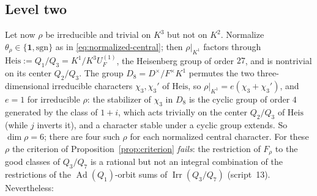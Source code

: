 \documentclass[11pt]{article}
\newcommand{\Irr}{\operatorname{Irr}}
\newcommand{\Ad}{\operatorname{Ad}}
\theoremstyle{plain}
\theoremstyle{definition}
\begin{document}
\subsection{Level two}\label{subsec:targetB}
Let now $\rho$ be irreducible and trivial on $K^3$ but not on $K^2$.
Normalize $\theta_\rho\in\{\mathbf1,\mathrm{sgn}\}$ as in
\eqref{eq:normalized-central}; then $\rho|_{K^1}$ factors through
$\mathrm{Heis}:=Q_1/Q_3=K^1/K^3U_F^{(1)}$, the Heisenberg group of order
$27$, and is nontrivial on its center $Q_2/Q_3$.  The group
$D_8=D^\times/F^\times K^1$ permutes the two three-dimensional
irreducible characters $\chi_3,\chi_3'$ of $\mathrm{Heis}$, so
$\rho|_{K^1}=e(\chi_3+\chi_3')$, and $e=1$ for irreducible $\rho$: the
stabilizer of $\chi_3$ in $D_8$ is the cyclic group of order $4$
generated by the class of $1+i$, which acts trivially on the center
$Q_2/Q_3$ of $\mathrm{Heis}$ (while $j$ inverts it), and a character
stable under a cyclic group extends.  So $\dim\rho=6$; there are four such $\rho$ for each normalized central
character.  For these $\rho$ the criterion of
Proposition~\ref{prop:criterion} \emph{fails}: the restriction of
$F_\rho$ to the good classes of $Q_3/Q_7$ is a rational but not an
integral combination of the restrictions of the $\Ad(Q_1)$-orbit sums of
$\Irr(Q_3/Q_7)$ (script~13).  Nevertheless:
\end{document}

